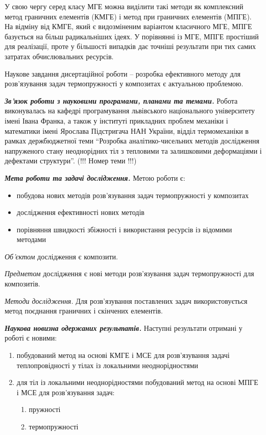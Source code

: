 У свою чергу серед класу МГЕ можна виділити такі методи як комплексний
метод граничних елементів (КМГЕ) і метод при граничних елементів (МПГЕ).
На відміну від КМГЕ, який є видозміненим варіантом класичного МГЕ, МПГЕ
базується на більш радикальніших ідеях. У порівнянні із МГЕ, МПГЕ
простіший для реалізації, проте у більшості випадків дає точніші
результати при тих самих затратах обчислювальних ресурсів.

Наукове завдання дисертаційної роботи -- розробка ефективного методу для
розв'язування задач термопружності у композитах є актуальною проблемою.

\emph{\textbf{Зв'язок роботи з науковими програмами, планами та
темами.}} Робота виконувалась на кафедрі програмування львівського
національного університету імені Івана Франка, а також у інституті
прикладних проблем механіки і математики імені Ярослава Підстригача НАН
України, відділ термомеханіки в рамках держбюджетної теми ``Розробка
аналітико-чисельних методів дослідження напруженого стану неоднорідних
тіл з тепловими та залишковими деформаціями і дефектами структури''.
(!!! Номер теми !!!)

\emph{\textbf{Мета роботи та задачі дослідження.}} Метою роботи є:

\begin{itemize}
\tightlist
\item
  побудова нових методів розв'язування задач термопружності у композитах
\item
  дослідження ефективності нових методів
\item
  порівняння швидкості збіжності і використання ресурсів із відомими
  методами
\end{itemize}

\emph{Об'єктом} дослідження є композити.

\emph{Предметом }дослідження є нові методи розв'язування задач
термопружності для композитів.

\emph{Методи дослідження. }Для розв'язування поставлених задач
використовується метод поєднання граничних і скінчених елементів.

\emph{\textbf{Наукова новизна одержаних результатів.}} Наступні
результати отримані у роботі є новими:

\begin{enumerate}
\def\labelenumi{\arabic{enumi}.}
\item
  побудований метод на основі КМГЕ і МСЕ для розв'язування задачі
  теплопровідності у тілах із локальними неоднорідностями
\item
  для тіл із локальними неоднорідностями побудований метод на основі
  МПГЕ і МСЕ для розв'язування задач:

  \begin{enumerate}
  \def\labelenumii{\alph{enumii}.}
  \tightlist
  \item
    пружності
  \item
    термопружності
  \end{enumerate}
\end{enumerate}

